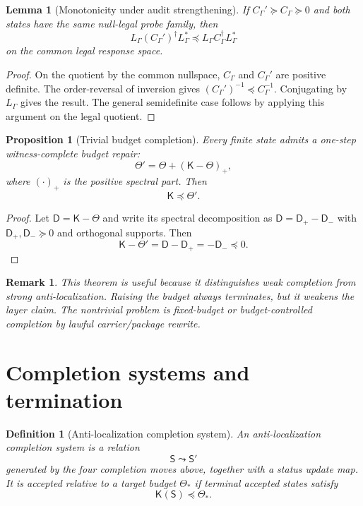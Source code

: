 \documentclass[11pt]{article}
\newtheorem{lemma}[theorem]{Lemma}
\newtheorem{proposition}[theorem]{Proposition}
\newtheorem{definition}[theorem]{Definition}
\newtheorem{remark}[theorem]{Remark}
\newcommand{\K}{\mathsf K}
\newcommand{\D}{\mathsf D}
\newcommand{\Sstate}{\mathsf S}
\newcommand{\pre}{\preceq}
\newcommand{\suc}{\succeq}
\begin{document}
\begin{lemma}[Monotonicity under audit strengthening]
If $C_\Gamma'\suc C_\Gamma\suc0$ and both states have the same null-legal probe family, then
\[
L_\Gamma (C_\Gamma')^\dagger L_\Gamma^*\pre L_\Gamma C_\Gamma^\dagger L_\Gamma^*
\]
on the common legal response space.
\end{lemma}

\begin{proof}
On the quotient by the common nullspace, $C_\Gamma$ and $C_\Gamma'$ are positive definite.  The order-reversal of inversion gives $(C_\Gamma')^{-1}\pre C_\Gamma^{-1}$.  Conjugating by $L_\Gamma$ gives the result.  The general semidefinite case follows by applying this argument on the legal quotient.
\end{proof}

\begin{proposition}[Trivial budget completion]
Every finite state admits a one-step witness-complete budget repair:
\[
\Theta' = \Theta + (\K-\Theta)_+,
\]
where $(\cdot)_+$ is the positive spectral part.  Then
\[
\K\pre\Theta'.
\]
\end{proposition}

\begin{proof}
Let $\D=\K-\Theta$ and write its spectral decomposition as $\D=\D_+-\D_-$ with $\D_+,\D_-\suc0$ and orthogonal supports.  Then
\[
\K-\Theta'=\D-\D_+=-\D_-\pre0.
\]
\end{proof}

\begin{remark}
This theorem is useful because it distinguishes weak completion from strong anti-localization.  Raising the budget always terminates, but it weakens the layer claim.  The nontrivial problem is fixed-budget or budget-controlled completion by lawful carrier/package rewrite.
\end{remark}

\section{Completion systems and termination}

\begin{definition}[Anti-localization completion system]
An anti-localization completion system is a relation
\[
\Sstate\leadsto \Sstate'
\]
generated by the four completion moves above, together with a status update map.  It is accepted relative to a target budget $\Theta_*$ if terminal accepted states satisfy
\[
\K(\Sstate)\pre\Theta_*.
\]
\end{definition}
\end{document}
